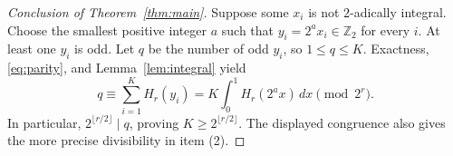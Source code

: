 \documentclass[11pt]{article}
\newcommand{\Zii}{\mathbb Z_2}
\begin{document}
\begin{proof}[Conclusion of Theorem~\ref{thm:main}]
Suppose some $x_i$ is not $2$-adically integral. Choose the smallest
positive integer $a$ such that $y_i=2^a x_i\in\Zii$ for every $i$.
At least one $y_i$ is odd. Let $q$ be the number of odd $y_i$, so
$1\leq q\leq K$. Exactness, \eqref{eq:parity}, and
Lemma~\ref{lem:integral} yield
\[
 q\equiv\sum_{i=1}^K H_r(y_i)
   =K\int_0^1 H_r(2^a x)\,dx\pmod{2^r}.
\]
In particular, $2^{\lfloor r/2\rfloor}\mid q$, proving $K\geq2^{\lfloor r/2\rfloor}$.
The displayed congruence also gives the more precise divisibility in item (2).
\end{proof}
\end{document}
